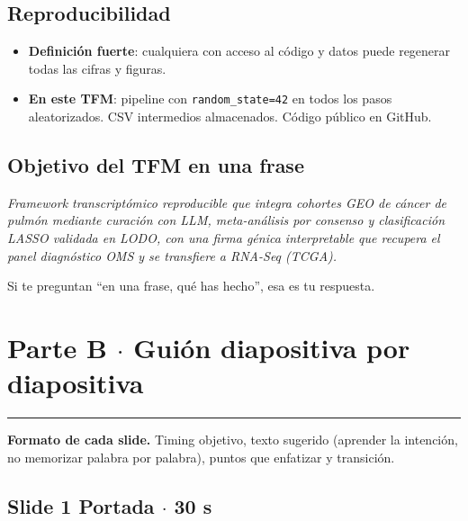 \documentclass[11pt, a4paper]{article}
\newcommand{\slidebadge}[1]{{\colorbox{verdeTerm}{\color{white}\bfseries\;#1\;}}}
\begin{document}
\subsection{Reproducibilidad}

\begin{itemize}[leftmargin=1.2em, itemsep=2pt]
  \item \textbf{Definici\'on fuerte}: cualquiera con acceso al c\'odigo y datos puede regenerar todas las cifras y figuras.
  \item \textbf{En este TFM}: pipeline con \texttt{random\_state=42} en todos los pasos aleatorizados. CSV intermedios almacenados. C\'odigo p\'ublico en GitHub.
\end{itemize}

\subsection{Objetivo del TFM en una frase}

\begin{tcolorbox}[colback=plano, colframe=verdeTerm, arc=3pt, boxrule=1pt]
\itshape\small
Framework transcript\'omico reproducible que integra cohortes GEO de c\'ancer de pulm\'on mediante curaci\'on con LLM, meta-an\'alisis por consenso y clasificaci\'on LASSO validada en LODO, con una firma g\'enica interpretable que recupera el panel diagn\'ostico OMS y se transfiere a RNA-Seq (TCGA).
\end{tcolorbox}

Si te preguntan ``en una frase, qu\'e has hecho'', esa es tu respuesta.

\newpage

\section*{Parte B $\cdot$ Gui\'on diapositiva por diapositiva}
{\color{verdeTerm}\rule{2.5cm}{2pt}}

\medskip

\textbf{Formato de cada slide.} Timing objetivo, texto sugerido (aprender la intenci\'on, no memorizar palabra por palabra), puntos que enfatizar y transici\'on.

\subsection*{\slidebadge{Slide 1} Portada $\cdot$ 30 s}
\end{document}
